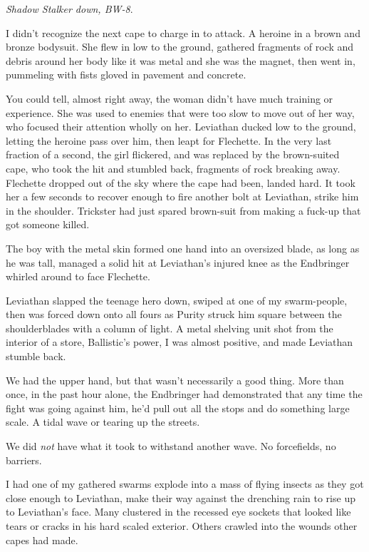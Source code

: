 \emph{Shadow Stalker down, BW-8}.



I didn't recognize the next cape to charge in to attack.  A heroine in a brown and bronze bodysuit.  She flew in low to the ground, gathered fragments of rock and debris around her body like it was metal and she was the magnet, then went in, pummeling with fists gloved in pavement and concrete.



You could tell, almost right away, the woman didn't have much training or experience.  She was used to enemies that were too slow to move out of her way, who focused their attention wholly on her.  Leviathan ducked low to the ground, letting the heroine pass over him, then leapt for Flechette.  In the very last fraction of a second, the girl flickered, and was replaced by the brown-suited cape, who took the hit and stumbled back, fragments of rock breaking away.  Flechette dropped out of the sky where the cape had been, landed hard.  It took her a few seconds to recover enough to fire another bolt at Leviathan, strike him in the shoulder.  Trickster had just spared brown-suit from making a fuck-up that got someone killed.



The boy with the metal skin formed one hand into an oversized blade, as long as he was tall, managed a solid hit at Leviathan's injured knee as the Endbringer whirled around to face Flechette.



Leviathan slapped the teenage hero down, swiped at one of my swarm-people, then was forced down onto all fours as Purity struck him square between the shoulderblades with a column of light.  A metal shelving unit shot from the interior of a store, Ballistic's power, I was almost positive, and made Leviathan stumble back.



We had the upper hand, but that wasn't necessarily a good thing.  More than once, in the past hour alone, the Endbringer had demonstrated that any time the fight was going against him, he'd pull out all the stops and do something large scale.  A tidal wave or tearing up the streets.



We did \emph{not} have what it took to withstand another wave.  No forcefields, no barriers.



I had one of my gathered swarms explode into a mass of flying insects as they got close enough to Leviathan, make their way against the drenching rain to rise up to Leviathan's face.  Many clustered in the recessed eye sockets that looked like tears or cracks in his hard scaled exterior.  Others crawled into the wounds other capes had made.



